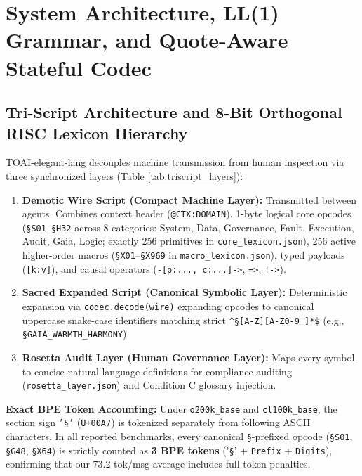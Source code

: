 \documentclass[9pt,a4paper]{extarticle}
\begin{document}
\section{System Architecture, LL(1) Grammar, and Quote-Aware Stateful Codec}
\subsection{Tri-Script Architecture and 8-Bit Orthogonal RISC Lexicon Hierarchy}
TOAI-elegant-lang decouples machine transmission from human inspection via three synchronized layers (Table \ref{tab:triscript_layers}):
\begin{enumerate}
  \item \textbf{Demotic Wire Script (Compact Machine Layer):} Transmitted between agents. Combines context header (\texttt{@CTX:DOMAIN}), 1-byte logical core opcodes (\texttt{\S S01}--\texttt{\S H32} across 8 categories: System, Data, Governance, Fault, Execution, Audit, Gaia, Logic; exactly 256 primitives in \texttt{core\_lexicon.json}), 256 active higher-order macros (\texttt{\S X01}--\texttt{\S X969} in \texttt{macro\_lexicon.json}), typed payloads (\texttt{[k:v]}), and causal operators (\texttt{-[p:..., c:...]->}, \texttt{=>}, \texttt{!->}).
  \item \textbf{Sacred Expanded Script (Canonical Symbolic Layer):} Deterministic expansion via \texttt{codec.decode(wire)} expanding opcodes to canonical uppercase snake-case identifiers matching strict \texttt{\^{}\S[A-Z][A-Z0-9\_]*\$} (e.g., \texttt{\S GAIA\_WARMTH\_HARMONY}).
  \item \textbf{Rosetta Audit Layer (Human Governance Layer):} Maps every symbol to concise natural-language definitions for compliance auditing (\texttt{rosetta\_layer.json}) and Condition C glossary injection.
\end{enumerate}

\textbf{Exact BPE Token Accounting:} Under \texttt{o200k\_base} and \texttt{cl100k\_base}, the section sign \texttt{'\S'} (\texttt{U+00A7}) is tokenized separately from following ASCII characters. In all reported benchmarks, every canonical \texttt{\S}-prefixed opcode (\texttt{\S S01}, \texttt{\S G48}, \texttt{\S X64}) is strictly counted as \textbf{3 BPE tokens} ('\texttt{\S}' + \texttt{Prefix} + \texttt{Digits}), confirming that our 73.2 tok/msg average includes full token penalties.
\end{document}

